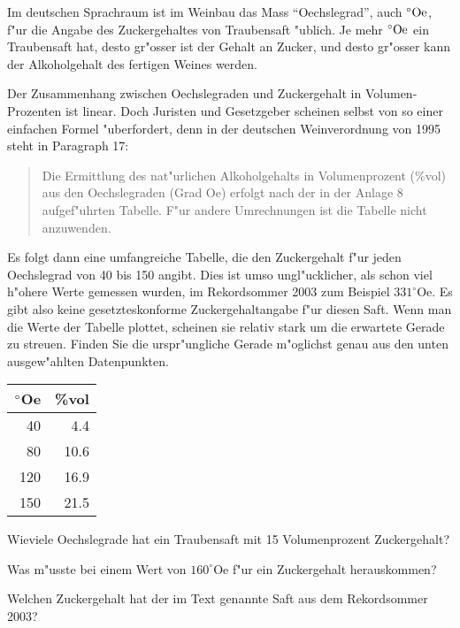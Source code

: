 Im deutschen Sprachraum ist im Weinbau das Mass ``Oechslegrad'', auch
$\mathstrut^\circ\text{Oe}$,
f"ur die
Angabe des Zuckergehaltes von Traubensaft "ublich. Je mehr 
$\mathstrut^\circ\text{Oe}$
ein Traubensaft hat, desto gr"osser ist der Gehalt an Zucker, und desto
gr"osser kann der Alkoholgehalt des fertigen Weines werden.

Der Zusammenhang zwischen Oechslegraden und Zuckergehalt in Volumen-Prozenten
ist linear. Doch Juristen und Gesetzgeber scheinen selbst von so einer einfachen
Formel "uberfordert, denn in der deutschen Weinverordnung von 1995 steht
in Paragraph 17: 
\begin{quote}
Die Ermittlung des nat"urlichen Alkoholgehalts in Volumenprozent (\%vol)
aus den Oechslegraden (Grad Oe) erfolgt nach der in der Anlage 8
aufgef"uhrten Tabelle. F"ur andere Umrechnungen ist die Tabelle nicht
anzuwenden.
\end{quote}
Es folgt dann eine umfangreiche
Tabelle, die den Zuckergehalt f"ur jeden Oechslegrad von 40 bis
150 angibt. Dies ist umso ungl"ucklicher, als schon viel h"ohere
Werte gemessen wurden, im Rekordsommer 2003 zum Beispiel $331^\circ\text{Oe}$.
Es gibt also keine gesetzteskonforme Zuckergehaltangabe f"ur diesen Saft.
Wenn man die Werte der Tabelle plottet, scheinen
sie relativ stark um die erwartete Gerade zu streuen. Finden Sie die
urspr"ungliche Gerade m"oglichst genau aus den unten ausgew"ahlten
Datenpunkten.
\begin{center}
\begin{tabular}{|r|r|}
\hline
$\mathstrut^\circ$Oe&\%vol\\
\hline
 40& 4.4\\
 80&10.6\\
120&16.9\\
150&21.5\\
\hline
\end{tabular}
\end{center}
\begin{teilaufgaben}
\item
Wieviele Oechslegrade hat ein Traubensaft mit 15 Volumenprozent Zuckergehalt?
\item
Was m"usste bei einem Wert von $160^\circ\text{Oe}$ f"ur ein Zuckergehalt 
herauskommen?
\item 
Welchen Zuckergehalt hat der im Text genannte Saft aus dem Rekordsommer 2003?
\end{teilaufgaben}

